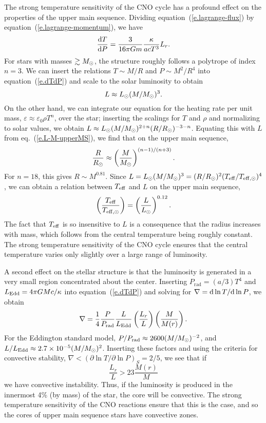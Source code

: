 The strong temperature sensitivity of the CNO cycle has a profound effect on the properties of the upper main sequence.  Dividing equation~(\ref{e.lagrange-flux}) by equation~(\ref{e.lagrange-momentum}), we have
\begin{equation}\label{e.dTdP}
 \frac{\mathrm{d} T}{\mathrm{d} P} = \frac{3}{16\pi Gm}\frac{\kappa}{ac T^{3}}L_{r}.
\end{equation}
For stars with masses $\gtrsim M_\odot$, the structure roughly follows a polytrope of index $n=3$.  We can insert the relations $T\sim M/R$ and $P\sim M^{2}/R^{4}$ into equation~(\ref{e.dTdP}) and scale to the solar luminosity to obtain 
\begin{equation}\label{e.L-M-upperMS}
L \approx L_{\odot} (M/M_\odot)^{3}.
\end{equation}
On the other hand, we can integrate our equation for the heating rate per unit mass, $\varepsilon \approx \varepsilon_{0}\rho T^{n}$, over the star; inserting the scalings for $T$ and $\rho$ and normalizing to solar values, we obtain $L\approx L_{\odot} (M/M_\odot)^{2+n}(R/R_{\odot})^{-3-n}$. Equating this with $L$ from eq.~(\ref{e.L-M-upperMS}), we find that on the upper main sequence,
\begin{equation}\label{e.R-M-upperMS}
\frac{R}{R_{\odot}} \approx \left(\frac{M}{M_\odot}\right)^{(n-1)/(n+3)}.
\end{equation}
For $n = 18$, this gives $R\sim M^{0.81}$.  Since $L = L_{\odot}(M/M_\odot)^{3} = (R/R_{\odot})^{2}(T_{\mathrm{eff}}/T_{\mathrm{eff,\odot}})^{4}$, we can obtain a relation between $T_{\mathrm{eff}}$ and $L$ on the upper main sequence,
\begin{equation}\label{e.Teff-L-upperMS}
\left(\frac{T_{\mathrm{eff}}}{T_{\mathrm{eff,\odot}}}\right) = \left(\frac{L}{L_{\odot}}\right)^{0.12}.
\end{equation}
The fact that $T_{\mathrm{eff}}$ is so insensitive to $L$ is a consequence that the radius increases with mass, which follows from the central temperature being roughly constant.  The strong temperature sensitivity of the CNO cycle ensures that the central temperature varies only slightly over a large range of luminosity.

A second effect on the stellar structure is that the luminosity is generated in a very small region concentrated about the center.  Inserting $P_{\mathrm{rad}} = (a/3) T^{4}$ and $L_{\mathrm{Edd}} = 4\pi GMc/\kappa$ into equation~(\ref{e.dTdP}) and solving for $\nabla = \mathrm{d}\ln T/\mathrm{d}\ln P$, we obtain
\begin{equation}\label{e.del}
\nabla = \frac{1}{4}\frac{P}{P_{\mathrm{rad}}}\frac{L}{L_{\mathrm{Edd}}}\left(\frac{L_{r}}{L}\right)\left(\frac{M}{M(r)}\right).
\end{equation}
For the Eddington standard model, $P/P_{\mathrm{rad}} \approx 2600 (M/M_\odot)^{-2}$, and $L/L_{\mathrm{Edd}} \approx 2.7\times 10^{-5} (M/M_\odot)^{2}$.  Inserting these factors and using the criteria for convective stability, $\nabla < (\partial\ln T/\partial\ln P)_{S} = 2/5$,  we see that if 
\[ \frac{L_{r}}{L} > 23 \frac{M(r)}{M} \]
we have convective instability.  Thus, if the luminosity is produced in the innermost 4\% (by mass) of the star, the core will be convective.  The strong temperature sensitivity of the CNO reactions ensure that this is the case, and so the cores of upper main sequence stars have convective zones.

